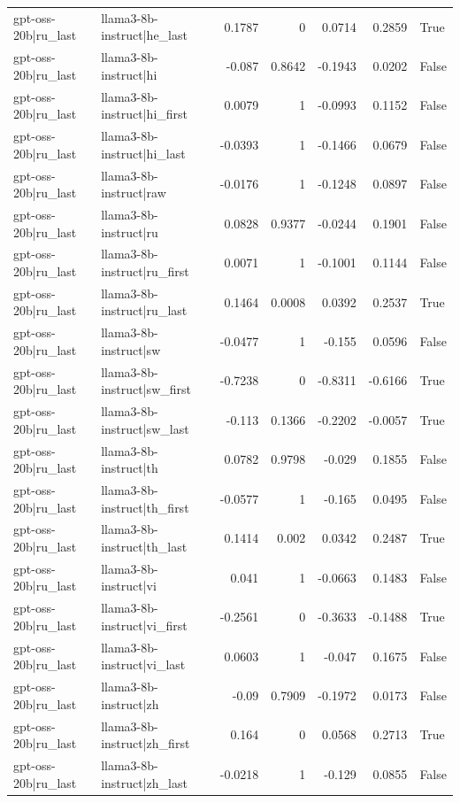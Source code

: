 \begin{table}
\begin{tabular}{l l r r r r l}
gpt-oss-20b|ru_last & llama3-8b-instruct|he_last & 0.1787 & 0 & 0.0714 & 0.2859 & True \\
gpt-oss-20b|ru_last & llama3-8b-instruct|hi & -0.087 & 0.8642 & -0.1943 & 0.0202 & False \\
gpt-oss-20b|ru_last & llama3-8b-instruct|hi_first & 0.0079 & 1 & -0.0993 & 0.1152 & False \\
gpt-oss-20b|ru_last & llama3-8b-instruct|hi_last & -0.0393 & 1 & -0.1466 & 0.0679 & False \\
gpt-oss-20b|ru_last & llama3-8b-instruct|raw & -0.0176 & 1 & -0.1248 & 0.0897 & False \\
gpt-oss-20b|ru_last & llama3-8b-instruct|ru & 0.0828 & 0.9377 & -0.0244 & 0.1901 & False \\
gpt-oss-20b|ru_last & llama3-8b-instruct|ru_first & 0.0071 & 1 & -0.1001 & 0.1144 & False \\
gpt-oss-20b|ru_last & llama3-8b-instruct|ru_last & 0.1464 & 0.0008 & 0.0392 & 0.2537 & True \\
gpt-oss-20b|ru_last & llama3-8b-instruct|sw & -0.0477 & 1 & -0.155 & 0.0596 & False \\
gpt-oss-20b|ru_last & llama3-8b-instruct|sw_first & -0.7238 & 0 & -0.8311 & -0.6166 & True \\
gpt-oss-20b|ru_last & llama3-8b-instruct|sw_last & -0.113 & 0.1366 & -0.2202 & -0.0057 & True \\
gpt-oss-20b|ru_last & llama3-8b-instruct|th & 0.0782 & 0.9798 & -0.029 & 0.1855 & False \\
gpt-oss-20b|ru_last & llama3-8b-instruct|th_first & -0.0577 & 1 & -0.165 & 0.0495 & False \\
gpt-oss-20b|ru_last & llama3-8b-instruct|th_last & 0.1414 & 0.002 & 0.0342 & 0.2487 & True \\
gpt-oss-20b|ru_last & llama3-8b-instruct|vi & 0.041 & 1 & -0.0663 & 0.1483 & False \\
gpt-oss-20b|ru_last & llama3-8b-instruct|vi_first & -0.2561 & 0 & -0.3633 & -0.1488 & True \\
gpt-oss-20b|ru_last & llama3-8b-instruct|vi_last & 0.0603 & 1 & -0.047 & 0.1675 & False \\
gpt-oss-20b|ru_last & llama3-8b-instruct|zh & -0.09 & 0.7909 & -0.1972 & 0.0173 & False \\
gpt-oss-20b|ru_last & llama3-8b-instruct|zh_first & 0.164 & 0 & 0.0568 & 0.2713 & True \\
gpt-oss-20b|ru_last & llama3-8b-instruct|zh_last & -0.0218 & 1 & -0.129 & 0.0855 & False \\

\end{tabular}
\end{table}

